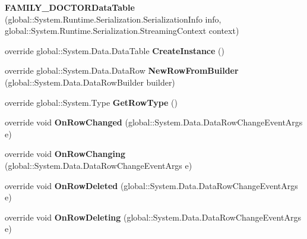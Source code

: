 \begin{CompactItemize}
\item 
\textbf{FAMILY\_\-DOCTORDataTable} (global::System.Runtime.Serialization.SerializationInfo info, global::System.Runtime.Serialization.StreamingContext context)\label{class_automatic_medical_system_1_1_data_set1_1_1_f_a_m_i_l_y___d_o_c_t_o_r_data_table_748073e1bfd97849bcca057eee6085c4}

\item 
override global::System.Data.DataTable \textbf{CreateInstance} ()\label{class_automatic_medical_system_1_1_data_set1_1_1_f_a_m_i_l_y___d_o_c_t_o_r_data_table_cbdd83814b00fa10248565d4fc8984a4}

\item 
override global::System.Data.DataRow \textbf{NewRowFromBuilder} (global::System.Data.DataRowBuilder builder)\label{class_automatic_medical_system_1_1_data_set1_1_1_f_a_m_i_l_y___d_o_c_t_o_r_data_table_e57c34874302166ab9cb8c4d6a62b05a}

\item 
override global::System.Type \textbf{GetRowType} ()\label{class_automatic_medical_system_1_1_data_set1_1_1_f_a_m_i_l_y___d_o_c_t_o_r_data_table_6b5b5aeac5fda64f3a54f5aca1e3d35e}

\item 
override void \textbf{OnRowChanged} (global::System.Data.DataRowChangeEventArgs e)\label{class_automatic_medical_system_1_1_data_set1_1_1_f_a_m_i_l_y___d_o_c_t_o_r_data_table_1cac2ec7103f717567bf1b46e61e8d20}

\item 
override void \textbf{OnRowChanging} (global::System.Data.DataRowChangeEventArgs e)\label{class_automatic_medical_system_1_1_data_set1_1_1_f_a_m_i_l_y___d_o_c_t_o_r_data_table_82a3a34cab162b49fe4118ef7ea878f3}

\item 
override void \textbf{OnRowDeleted} (global::System.Data.DataRowChangeEventArgs e)\label{class_automatic_medical_system_1_1_data_set1_1_1_f_a_m_i_l_y___d_o_c_t_o_r_data_table_151b33468352093cb38bbb6e893a3841}

\item 
override void \textbf{OnRowDeleting} (global::System.Data.DataRowChangeEventArgs e)\label{class_automatic_medical_system_1_1_data_set1_1_1_f_a_m_i_l_y___d_o_c_t_o_r_data_table_396eca5f7cb60f63c021a6b40ec6fabb}

\end{CompactItemize}
